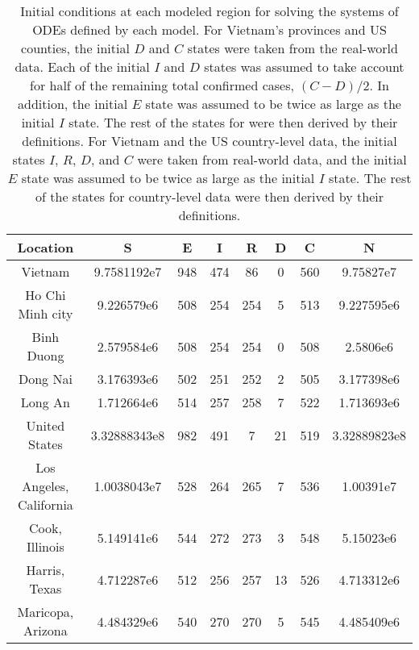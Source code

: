 \begin{table}[h]
    \centering
    \begin{tabular}{| c | c | c | c | c | c | c | c |}
        Location & S & E & I & R & D & C & N \\
        \hline\hline
        Vietnam & 9.7581192e7 & 948 & 474 & 86 & 0 & 560 & 9.75827e7 \\
        \hline
        Ho Chi Minh city & 9.226579e6 & 508 & 254 & 254 & 5 & 513 & 9.227595e6 \\
        \hline
        Binh Duong & 2.579584e6 & 508 & 254 & 254 & 0 & 508 & 2.5806e6 \\
        \hline
        Dong Nai & 3.176393e6 & 502 & 251 & 252 & 2 & 505 & 3.177398e6 \\
        \hline
        Long An & 1.712664e6 & 514 & 257 & 258 & 7 & 522 & 1.713693e6 \\
        \hline
        United States & 3.32888343e8 & 982 & 491 & 7 & 21 & 519 & 3.32889823e8 \\
        \hline
        Los Angeles, California & 1.0038043e7 & 528 & 264 & 265 & 7 & 536 & 1.00391e7 \\
        \hline
        Cook, Illinois & 5.149141e6 & 544 & 272 & 273 & 3 & 548 & 5.15023e6 \\
        \hline
        Harris, Texas & 4.712287e6 & 512 & 256 & 257 & 13 & 526 & 4.713312e6 \\
        \hline
        Maricopa, Arizona & 4.484329e6 & 540 & 270 & 270 & 5 & 545 & 4.485409e6 \\
        \hline
    \end{tabular}
    \caption{Initial conditions at each modeled region for solving the systems of \glspl{ODE} defined by each model. For Vietnam's provinces and \gls{US} counties, the initial $D$ and $C$ states were taken from the real-world data. Each of the initial $I$ and $D$ states was assumed to take account for half of the remaining total confirmed cases, $(C - D) / 2$. In addition, the initial $E$ state was assumed to be twice as large as the initial $I$ state. The rest of the states for were then derived by their definitions. For Vietnam and the \gls{US} country-level data, the initial states $I$, $R$, $D$, and $C$ were taken from real-world data, and the initial $E$ state was assumed to be twice as large as the initial $I$ state. The rest of the states for country-level data were then derived by their definitions.}
    \label{tab:ude-model-initial-conditions}
\end{table}

